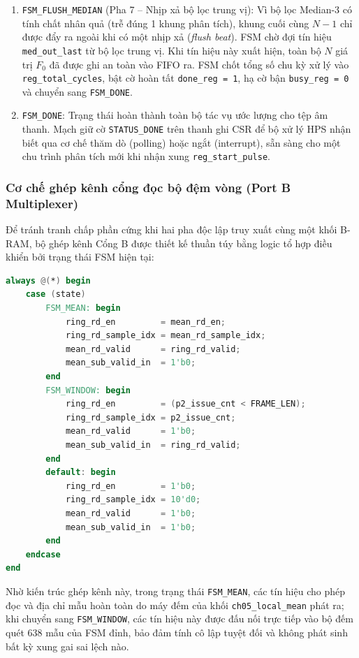 \begin{enumerate}
    \item \texttt{FSM\_FLUSH\_MEDIAN} (Pha 7 -- Nhịp xả bộ lọc trung vị): Vì bộ lọc Median-3 có tính chất nhân quả (trễ đúng 1 khung phân tích), khung cuối cùng $N-1$ chỉ được đẩy ra ngoài khi có một nhịp xả (\emph{flush beat}). FSM chờ đợi tín hiệu \texttt{med\_out\_last} từ bộ lọc trung vị. Khi tín hiệu này xuất hiện, toàn bộ $N$ giá trị $F_0$ đã được ghi an toàn vào FIFO ra. FSM chốt tổng số chu kỳ xử lý vào \texttt{reg\_total\_cycles}, bật cờ hoàn tất \texttt{done\_reg = 1}, hạ cờ bận \texttt{busy\_reg = 0} và chuyển sang \texttt{FSM\_DONE}.

    \item \texttt{FSM\_DONE}: Trạng thái hoàn thành toàn bộ tác vụ ước lượng cho tệp âm thanh. Mạch giữ cờ \texttt{STATUS\_DONE} trên thanh ghi CSR để bộ xử lý HPS nhận biết qua cơ chế thăm dò (polling) hoặc ngắt (interrupt), sẵn sàng cho một chu trình phân tích mới khi nhận xung \texttt{reg\_start\_pulse}.
\end{enumerate}

\subsubsection*{Cơ chế ghép kênh cổng đọc bộ đệm vòng (Port B Multiplexer)}
Để tránh tranh chấp phần cứng khi hai pha độc lập truy xuất cùng một khối B-RAM, bộ ghép kênh Cổng B được thiết kế thuần túy bằng logic tổ hợp điều khiển bởi trạng thái FSM hiện tại:
\begin{lstlisting}[language=Verilog, caption={Logic ghép kênh cổng đọc Cổng B của bộ đệm vòng trong \texttt{ch12\_top.v}.}]
always @(*) begin
    case (state)
        FSM_MEAN: begin
            ring_rd_en         = mean_rd_en;
            ring_rd_sample_idx = mean_rd_sample_idx;
            mean_rd_valid      = ring_rd_valid;
            mean_sub_valid_in  = 1'b0;
        end
        FSM_WINDOW: begin
            ring_rd_en         = (p2_issue_cnt < FRAME_LEN);
            ring_rd_sample_idx = p2_issue_cnt;
            mean_rd_valid      = 1'b0;
            mean_sub_valid_in  = ring_rd_valid;
        end
        default: begin
            ring_rd_en         = 1'b0;
            ring_rd_sample_idx = 10'd0;
            mean_rd_valid      = 1'b0;
            mean_sub_valid_in  = 1'b0;
        end
    endcase
end
\end{lstlisting}
Nhờ kiến trúc ghép kênh này, trong trạng thái \texttt{FSM\_MEAN}, các tín hiệu cho phép đọc và địa chỉ mẫu hoàn toàn do máy đếm của khối \texttt{ch05\_local\_mean} phát ra; khi chuyển sang \texttt{FSM\_WINDOW}, các tín hiệu này được đấu nối trực tiếp vào bộ đếm quét 638 mẫu của FSM đỉnh, bảo đảm tính cô lập tuyệt đối và không phát sinh bất kỳ xung gai sai lệch nào.

